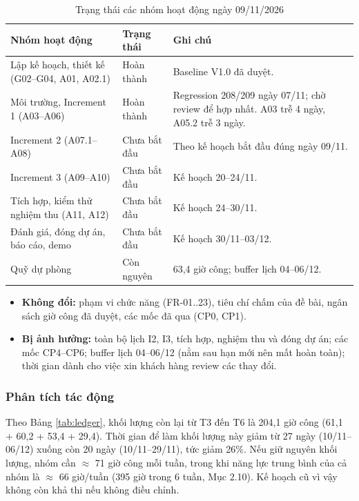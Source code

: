 \begin{table}[H]
\centering\small
\caption{Trạng thái các nhóm hoạt động ngày 09/11/2026}\label{tab:t3-cr05-status}
\begin{tabularx}{\linewidth}{@{}p{.32\linewidth}p{.17\linewidth}X@{}}
\toprule
\textbf{Nhóm hoạt động} & \textbf{Trạng thái} & \textbf{Ghi chú}\\\midrule
Lập kế hoạch, thiết kế (G02--G04, A01, A02.1) & Hoàn thành & Baseline V1.0 đã duyệt.\\
Môi trường, Increment 1 (A03--A06) & Hoàn thành & Regression 208/209 ngày 07/11; chờ review để hợp nhất. A03 trễ 4 ngày, A05.2 trễ 3 ngày.\\
Increment 2 (A07.1--A08) & Chưa bắt đầu & Theo kế hoạch bắt đầu đúng ngày 09/11.\\
Increment 3 (A09--A10) & Chưa bắt đầu & Kế hoạch 20--24/11.\\
Tích hợp, kiểm thử nghiệm thu (A11, A12) & Chưa bắt đầu & Kế hoạch 24--30/11.\\
Đánh giá, đóng dự án, báo cáo, demo & Chưa bắt đầu & Kế hoạch 30/11--03/12.\\
Quỹ dự phòng & Còn nguyên & 63,4 giờ công; buffer lịch 04--06/12.\\
\bottomrule
\end{tabularx}
\end{table}


\begin{itemize}
    \item \textbf{Không đổi:} phạm vi chức năng (FR-01..23), tiêu chí chấm của đề bài, ngân sách giờ công đã duyệt, các mốc đã qua (CP0, CP1).
    \item \textbf{Bị ảnh hưởng:} toàn bộ lịch I2, I3, tích hợp, nghiệm thu và đóng dự án; các mốc CP4--CP6; buffer lịch 04--06/12 (nằm sau hạn mới nên mất hoàn toàn); thời gian dành cho việc xin khách hàng review các thay đổi.
\end{itemize}

\subsubsection{Phân tích tác động}

Theo Bảng \ref{tab:ledger}, khối lượng còn lại từ T3 đến T6 là 204,1 giờ công (61,1 + 60,2 + 53,4 + 29,4). Thời gian để làm khối lượng này giảm từ 27 ngày (10/11--06/12) xuống còn 20 ngày (10/11--29/11), tức giảm 26\%. Nếu giữ nguyên khối lượng, nhóm cần $\approx$ 71 giờ công mỗi tuần, trong khi năng lực trung bình của cả nhóm là $\approx$ 66 giờ/tuần (395 giờ trong 6 tuần, Mục 2.10). Kế hoạch cũ vì vậy không còn khả thi nếu không điều chỉnh.


